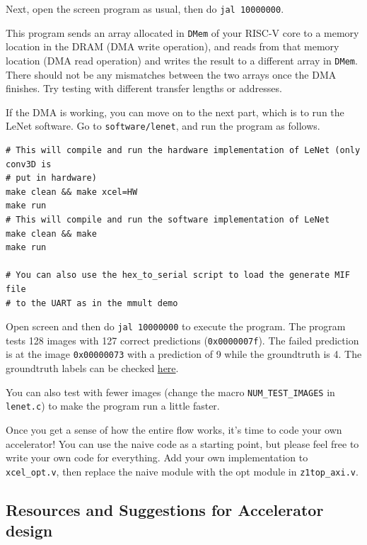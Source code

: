 \documentclass[11pt]{article}
\begin{document}
Next, open the screen program as usual, then do \verb|jal 10000000|.

This program sends an array allocated in \texttt{DMem} of your RISC-V core to a memory location in the DRAM (DMA write operation), and reads from that memory location (DMA read operation) and writes the result to a different array in \texttt{DMem}. There should not be any mismatches between the two arrays once the DMA finishes. Try testing with different transfer lengths or addresses.

If the DMA is working, you can move on to the next part, which is to run the LeNet software. Go to \verb|software/lenet|, and run the program as follows.

\begin{verbatim}
# This will compile and run the hardware implementation of LeNet (only conv3D is
# put in hardware)
make clean && make xcel=HW
make run
# This will compile and run the software implementation of LeNet
make clean && make
make run

# You can also use the hex_to_serial script to load the generate MIF file
# to the UART as in the mmult demo

\end{verbatim}

Open screen and then do \verb|jal 10000000| to execute the program.
The program tests 128 images with 127 correct predictions (\verb|0x0000007f|).
The failed prediction is at the image \verb|0x00000073| with a prediction of 9
while the groundtruth is 4. The groundtruth labels can be checked \href{https://github.com/EECS150/arm_baremetal_app/blob/main/system/src/labels.h}{here}.

You can also test with fewer images (change the macro \verb|NUM_TEST_IMAGES| in \verb|lenet.c|) to make the program run a little faster.

Once you get a sense of how the entire flow works, it's time to code your own accelerator!
You can use the naive code as a starting point, but please feel free to write your own code for everything.
Add your own implementation to \verb|xcel_opt.v|, then replace the naive module with the opt module
in \verb|z1top_axi.v|.

\subsection{Resources and Suggestions for Accelerator design}
\end{document}
